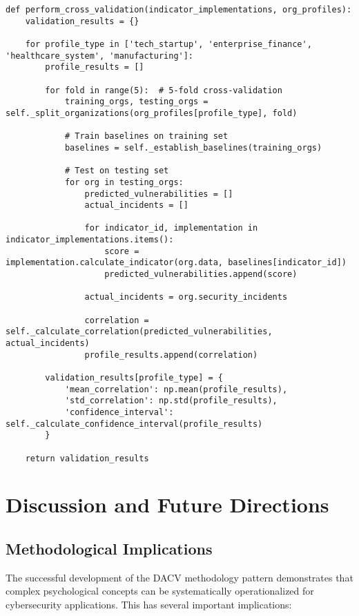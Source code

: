 \documentclass[11pt, onecolumn]{article}
\begin{document}
\begin{lstlisting}
def perform_cross_validation(indicator_implementations, org_profiles):
    validation_results = {}
    
    for profile_type in ['tech_startup', 'enterprise_finance', 'healthcare_system', 'manufacturing']:
        profile_results = []
        
        for fold in range(5):  # 5-fold cross-validation
            training_orgs, testing_orgs = self._split_organizations(org_profiles[profile_type], fold)
            
            # Train baselines on training set
            baselines = self._establish_baselines(training_orgs)
            
            # Test on testing set
            for org in testing_orgs:
                predicted_vulnerabilities = []
                actual_incidents = []
                
                for indicator_id, implementation in indicator_implementations.items():
                    score = implementation.calculate_indicator(org.data, baselines[indicator_id])
                    predicted_vulnerabilities.append(score)
                
                actual_incidents = org.security_incidents
                
                correlation = self._calculate_correlation(predicted_vulnerabilities, actual_incidents)
                profile_results.append(correlation)
        
        validation_results[profile_type] = {
            'mean_correlation': np.mean(profile_results),
            'std_correlation': np.std(profile_results),
            'confidence_interval': self._calculate_confidence_interval(profile_results)
        }
    
    return validation_results
\end{lstlisting}

\section{Discussion and Future Directions}

\subsection{Methodological Implications}

The successful development of the DACV methodology pattern demonstrates that complex psychological concepts can be systematically operationalized for cybersecurity applications. This has several important implications:
\end{document}
